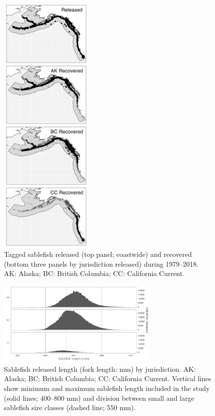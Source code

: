 \documentclass{article}
\begin{document}
\begin{figure}[htb]
    \centering
    \includegraphics[width = 0.4\textwidth]{map-regions-3-released-recovered}
    \caption{Tagged sablefish released (top panel; coastwide) and recovered (bottom three panels by jurisdiction released) during 1979--2018. AK: Alaska; BC: British Columbia; CC: California Current.}
    \label{fig:map-regions-3-released-recovered}
\end{figure}

\begin{figure}[htb]
    \centering
    \includegraphics[width = 0.7\textwidth]{bar-regions-3-released-by-size}
    \caption{Sablefish released length (fork length: mm) by jurisdiction. AK: Alaska; BC: British Columbia; CC: California Current. Vertical lines show minimum and maximum sablefish length included in the study (solid lines; 400--800 mm) and division between small and large sablefish size classes (dashed line; 550 mm).}
    \label{fig:bar-regions-3-released-by-size}
\end{figure}
\end{document}
